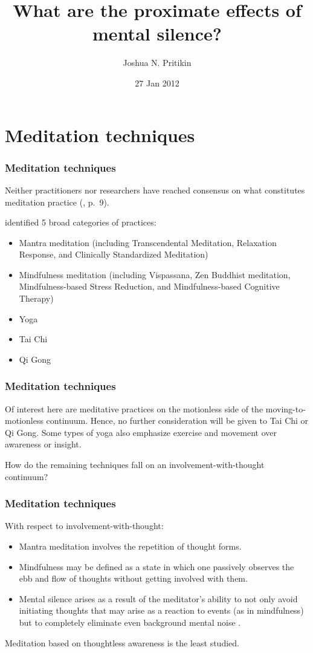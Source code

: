 \documentclass[10pt,utf8x]{beamer}
\title[What are the proximate effects of mental silence?] %
{What are the proximate effects of mental silence?}
\author[Joshua N. Pritikin] %
{Joshua N. Pritikin}
\institute[University of Virginia] %
{
  Department of Psychology\\
  University of Virginia
}
\date[Nesselroade] %
{\footnotesize 27 Jan 2012}
\begin{document}
\begin{frame}
  \titlepage
\end{frame}

\section{Meditation techniques}
\begin{frame}
\frametitle{Meditation techniques}
Neither practitioners nor researchers have reached consensus
on what constitutes meditation practice (, p.~9).

\medskip
{} identified 5 broad categories of practices:
\begin{itemize}
\item Mantra meditation (including Transcendental Meditation, Relaxation Response, and Clinically Standardized Meditation)
\item Mindfulness meditation (including Vispassana, Zen Buddhist meditation,
Mindfulness-based Stress Reduction, and Mindfulness-based Cognitive Therapy)
\item Yoga
\item Tai Chi
\item Qi Gong
\end{itemize}
\end{frame}

\begin{frame}
\frametitle{Meditation techniques}

Of interest here are meditative practices on the motionless side of
the moving-to-motionless continuum. Hence, no further consideration
will be given to Tai Chi or Qi Gong. Some types of yoga also emphasize
exercise and movement over awareness or insight.

\bigskip
How do the remaining techniques fall on an involvement-with-thought
continuum?

\end{frame}

\begin{frame}
\frametitle{Meditation techniques}

With respect to involvement-with-thought:
\begin{itemize}
\item Mantra meditation involves the repetition of thought forms.

\item Mindfulness may be defined as a state in which one passively observes
the ebb and flow of thoughts without getting involved with them.

\item Mental silence arises as a result of the meditator’s ability to not
only avoid initiating thoughts that may arise as a reaction to events
(as in mindfulness) but to completely eliminate even background mental
noise \cite{manocha2000}.
\end{itemize}

Meditation based on thoughtless awareness is the least studied.

\end{frame}
\end{document}
